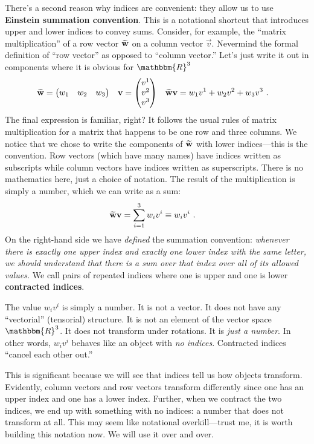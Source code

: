 \documentclass[12pt]{article}
\begin{document}
There's a second reason why indices are convenient: they allow us to use \textbf{Einstein summation convention}. This is a notational shortcut that introduces upper and lower indices to convey sums. Consider, for example, the ``matrix multiplication'' of a row vector $\widetilde{\mathbf{w}}$ on a column vector $\vec{v}$. Nevermind the formal definition of ``row vector'' as opposed to ``column vector.'' Let's just write it out in components where it is obvious for $\mathbbm{R}^3$
\begin{align}
    \widetilde{\mathbf{w}}
    &=
    \begin{pmatrix}
        w_1 & w_2 & w_3
    \end{pmatrix}
    &
    \mathbf{v}
    &=
    \begin{pmatrix}
        v^1 \\ v^2 \\ v^3
    \end{pmatrix}
    &
    \widetilde{\mathbf{w}}\mathbf{v}
    &= w_1v^1 + w_2v^2+w_3v^3 \ .
\end{align}
The final expression is familiar, right? It follows the usual rules of matrix multiplication for a matrix that happens to be one row and three columns. We notice that we chose to write the components of $\widetilde{\mathbf{w}}$ with lower indices---this is the convention. Row vectors (which have many names) have indices written as subscripts while column vectors have indices written as superscripts. There is no mathematics here, just a choice of notation. The result of the multiplication is simply a number, which we can write as a sum:
\begin{align}
    \widetilde{\mathbf{w}}\mathbf{v}
    &= \sum_{i=1}^3 w_iv^i
    \equiv w_iv^i \ .
    \label{eq:row:w:on:vec:v}
\end{align}
On the right-hand side we have \emph{defined} the summation convention: \emph{whenever there is exactly one upper index and exactly one lower index with the same letter, we should understand that there is a sum over that index over all of its allowed values.} We call pairs of repeated indices where one is upper and one is lower \textbf{contracted indices}.


The value $w_iv^i$ is simply a number. It is not a vector. It does not have any ``vectorial'' (tensorial) structure. It is not an element of the vector space $\mathbbm{R}^3$. It does not transform under rotations. It is \emph{just a number}. In other words, $w_iv^i$ behaves like an object with \emph{no indices}. Contracted indices ``cancel each other out.''

This is significant because we will see that indices tell us how objects transform. Evidently, column vectors and row vectors transform differently since one has an upper index and one has a lower index. Further, when we contract the two indices, we end up with something with no indices: a number that does not transform at all. This may seem like notational overkill---trust me, it is worth building this notation now. We will use it over and over.
\end{document}
